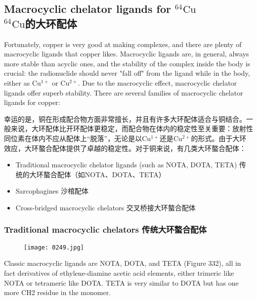 \documentclass[dvipsnames, svgnames,a4paper,11pt]{article}
\begin{document}
\subsection{Macrocyclic chelator ligands for \(\mathrm{^{64}Cu}\)\\ \(\mathrm{^{64}Cu}\)的大环配体}  

Fortunately, copper is very good at making complexes, and there are plenty of macrocyclic ligands that copper likes. Macrocyclic ligands are, in general, always more stable than acyclic ones, and the stability of the complex inside the body is crucial: the radionuclide should never "fall off" from the ligand while in the body, either as \(\mathrm{Cu^{1+}}\) or \(\mathrm{Cu^{2+}}\). Due to the macrocyclic effect, macrocyclic chelator ligands offer superb stability. There are several families of macrocyclic chelator ligands for copper:

幸运的是，铜在形成配合物方面非常擅长，并且有许多大环配体适合与铜结合。一般来说，大环配体比开环配体更稳定，而配合物在体内的稳定性至关重要：放射性同位素在体内不应从配体上“脱落”，无论是以\(\mathrm{Cu^{1+}}\)还是\(\mathrm{Cu^{2+}}\)的形式。由于大环效应，大环螯合配体提供了卓越的稳定性。对于铜来说，有几类大环螯合配体：

\begin{itemize}
  \item Traditional macrocyclic chelator ligands (such as NOTA, DOTA, TETA) 传统的大环螯合配体（如NOTA、DOTA、TETA）
  \item Sarcophagines 沙棺配体
  \item Cross-bridged macrocyclic chelators 交叉桥接大环螯合配体
\end{itemize}

\subsubsection{Traditional macrocyclic chelators 传统大环螯合配体}  

\begin{figure}[h]
	\centering
    \texttt{[image: 0249.jpg]}  
     \label{fig332}
\end{figure}

Classic macrocyclic ligands are NOTA, DOTA, and TETA (Figure 332), all in fact derivatives of ethylene-diamine acetic acid elements, either trimeric like NOTA or tetrameric like DOTA. TETA is very similar to DOTA but has one more CH2 residue in the monomer.
\end{document}
